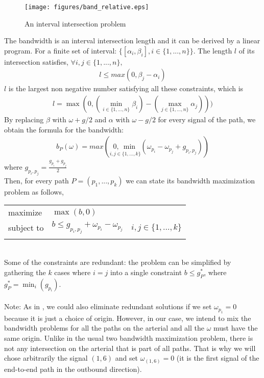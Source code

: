 \begin{figure}[!h]
\centering
\texttt{[image: figures/band\_relative.eps]}
\caption{An interval intersection problem}
\label{fig:interval}
\end{figure}

The bandwidth is an interval intersection length and it can be derived by a linear program. For a finite set of interval: $\{[\alpha_{i},\beta_{i}] , i \in \{1,...,n\}\}$. The length $l$ of its intersection satisfies, $\forall i,j \in \{1,...,n\},$
\begin{align*}
l \leq max(0,\beta_{j}-\alpha_{i})
\end{align*}
$l$ is the largest non negative number satisfying  all these constraints, which is
\begin{align*}
l = \max(0, (\min_{i\in\{1,...,n\}}\beta_{i})-(\max_{j\in\{1,...,n\}}\alpha_{j})))
\end{align*}
By replacing $\beta$ with $\omega+g/2$ and $\alpha$ with $\omega-g/2$ for every signal of the path, we obtain the formula for the bandwidth:
\begin{align}
b_P(\omega) = max(\underset{i,j\in\{1,...,k\}}{0,~ \min}(\omega_{p_i}-\omega_{p_j}+g_{p_i,p_j}))
\end{align}
where $g_{p_i,p_j}=\frac{g_{p_i}+g_{p_j}}{2}$\\
Then, for every path $P = (p_1,...,p_k)$ we can state its bandwidth maximization problem as follows,\\
\begin{tabular}{lll}
maximize & $\max (b, 0)$ & \\
subject to & $b \leq g_{p_i,p_j}+\omega_{p_i} - \omega_{p_j}$ & $i,j \in \{1,...,k\}$\\
  & & \\
\end{tabular}\\
Some of the constraints are redundant: the problem can be simplified by gathering the $k$ cases where $i = j$ into a single constraint $b \leq g_P^{*}$, where $g_P^{*} = \min_{i}(g_{p_i})$.\\ \\
Note: As in \cite{bandmax}, we could also eliminate redundant solutions if we set $\omega_{p_1} = 0$ because it is just a choice of origin. However, in our case, we intend to mix the bandwidth problems for all the paths on the arterial and all the $\omega$ must have the same origin. Unlike in the usual two bandwidth maximization problem, there is not any intersection on the arterial that is part of all paths. That is why we will chose arbitrarily the signal $(1,6)$ and set $\omega_{(1,6)}=0$ (it is the first signal of the end-to-end path in the outbound direction).\\
